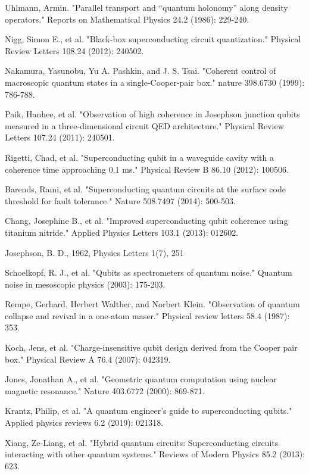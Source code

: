 \begin{thebibliography}{9}
Uhlmann, Armin. "Parallel transport and “quantum holonomy” along density operators." Reports on Mathematical Physics 24.2 (1986): 229-240.



Nigg, Simon E., et al. "Black-box superconducting circuit quantization." Physical Review Letters 108.24 (2012): 240502.

Nakamura, Yasunobu, Yu A. Pashkin, and J. S. Tsai. "Coherent control of macroscopic quantum states in a single-Cooper-pair box." nature 398.6730 (1999): 786-788.

Paik, Hanhee, et al. "Observation of high coherence in Josephson junction qubits measured in a three-dimensional circuit QED architecture." Physical Review Letters 107.24 (2011): 240501.

Rigetti, Chad, et al. "Superconducting qubit in a waveguide cavity with a coherence time approaching 0.1 ms." Physical Review B 86.10 (2012): 100506.

Barends, Rami, et al. "Superconducting quantum circuits at the surface code threshold for fault tolerance." Nature 508.7497 (2014): 500-503.

Chang, Josephine B., et al. "Improved superconducting qubit coherence using titanium nitride." Applied Physics Letters 103.1 (2013): 012602.

Josephson, B. D., 1962, Physics Letters 1(7), 251


Schoelkopf, R. J., et al. "Qubits as spectrometers of quantum noise." Quantum noise in mesoscopic physics (2003): 175-203.

Rempe, Gerhard, Herbert Walther, and Norbert Klein. "Observation of quantum collapse and revival in a one-atom maser." Physical review letters 58.4 (1987): 353.

Koch, Jens, et al. "Charge-insensitive qubit design derived from the Cooper pair box." Physical Review A 76.4 (2007): 042319.

 Jones, Jonathan A., et al. "Geometric quantum computation using nuclear magnetic resonance." Nature 403.6772 (2000): 869-871.

 Krantz, Philip, et al. "A quantum engineer's guide to superconducting qubits." Applied physics reviews 6.2 (2019): 021318.

Xiang, Ze-Liang, et al. "Hybrid quantum circuits: Superconducting circuits interacting with other quantum systems." Reviews of Modern Physics 85.2 (2013): 623. 


\end{thebibliography}
